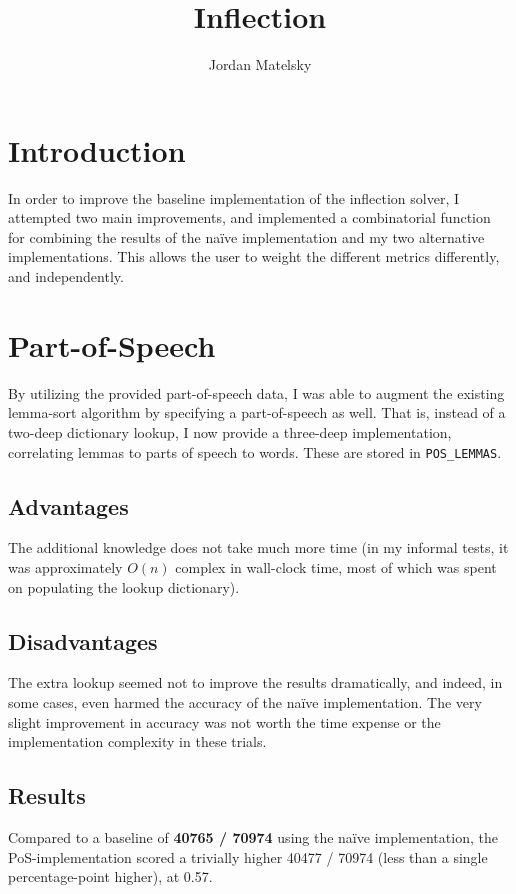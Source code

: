 \documentclass{article}
\title{Inflection}
\author{Jordan Matelsky}
\begin{document}
\maketitle

\section{Introduction}
In order to improve the baseline implementation of the inflection solver, I attempted two main improvements, and implemented a combinatorial function for combining the results of the naïve implementation and my two alternative implementations. This allows the user to weight the different metrics differently, and independently.

\section{Part-of-Speech}
By utilizing the provided part-of-speech data, I was able to augment the existing lemma-sort algorithm by specifying a part-of-speech as well. That is, instead of a two-deep dictionary lookup, I now provide a three-deep implementation, correlating lemmas to parts of speech to words. These are stored in \texttt{POS\_LEMMAS}.

\subsection{Advantages}
The additional knowledge does not take much more time (in my informal tests, it was approximately $O(n)$ complex in wall-clock time, most of which was spent on populating the lookup dictionary). 

\subsection{Disadvantages}
The extra lookup seemed not to improve the results dramatically, and indeed, in some cases, even harmed the accuracy of the naïve implementation. The very slight improvement in accuracy was not worth the time expense or the implementation complexity in these trials.

\subsection{Results}
Compared to a baseline of \textbf{40765 / 70974} using the naïve implementation, the PoS-implementation scored a trivially higher 40477 / 70974 (less than a single percentage-point higher), at 0.57.
\end{document}
